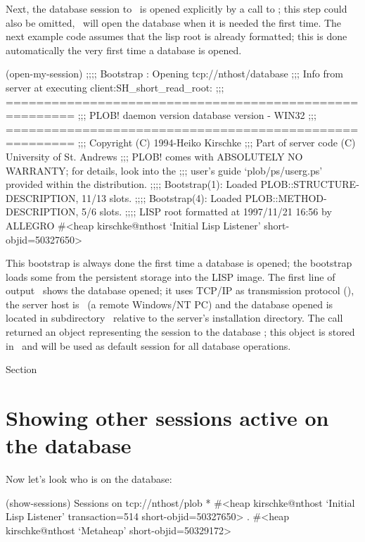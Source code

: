 Next, the database session to \plob\ is opened explicitly by a call to
; this step could also be omitted, \plob\ will
open the database when it is needed the first time. The next example
code assumes that the lisp root is already formatted; this is done
automatically the very first time a database is opened.
\begin{CompactCode}
\listener{}(open-my-session)
;;;; Bootstrap   : Opening tcp://nthost/database\marginnumber{\smalloi}
;;; Info from server at executing client:SH_short_read_root:
;;; =======================================================
;;; PLOB! daemon version \thisversion\space{}database version \thisversion\space{}- WIN32
;;; =======================================================
;;; Copyright (C) 1994-\thisyear Heiko Kirschke \thisemail
;;; Part of server code (C) University of St. Andrews
;;; PLOB! comes with ABSOLUTELY NO WARRANTY; for details, look into the
;;; user's guide `plob/ps/userg.ps' provided within the distribution.
;;;; Bootstrap(1): Loaded PLOB::STRUCTURE-DESCRIPTION, 11/13 slots.
\OmitUnimportant
;;;; Bootstrap(4): Loaded PLOB::METHOD-DESCRIPTION, 5/6 slots.
;;;; LISP root formatted at 1997/11/21 16:56 by ALLEGRO
#<heap kirschke@nthost `Initial Lisp Listener' short-objid=50327650>\marginnumber{\smalloii}
\end{CompactCode}

This bootstrap is always done the first time a database is opened; the
bootstrap loads some \mo[s] from the persistent storage into the LISP
image. The first line of output \oi\ shows the database opened; it
uses TCP/IP as transmission protocol (), the server host is
\ (a remote Windows/NT PC) and the database opened is
located in subdirectory \ relative to the server's
installation directory. The call returned an object representing the
session to the database \oii; this object is stored in
\ and will be used as default session
for all database operations.

 Section 

\section[Showing other sessions]%
{Showing other sessions active on the database}

Now let's look who is on the database:
\begin{CompactCode}
\listener{}(show-sessions)
  Sessions on tcp://nthost/plob
* #<heap kirschke@nthost `Initial Lisp Listener'\marginnumber{\smalloi}
         transaction=514 short-objid=50327650>
. #<heap kirschke@nthost `Metaheap' short-objid=50329172>\marginnumber{\smalloii}
\end{CompactCode}

